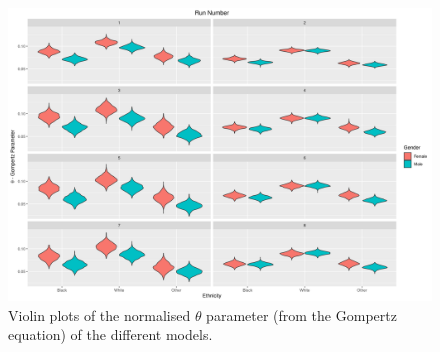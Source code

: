 \documentclass[
]{article}
\begin{document}
\begin{figure}
\hypertarget{fig:gompt}{%
\centering
\includegraphics{./Plots/gompertz/theta_parameter.png}
\caption{Violin plots of the normalised \(\theta\) parameter (from the Gompertz equation) of the different models.}\label{fig:gompt}
}
\end{figure}
\end{document}

